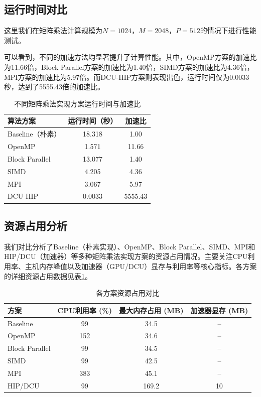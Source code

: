 \documentclass[UTF8,a4paper,10pt]{ctexart}
\begin{document}
\subsection{运行时间对比}

这里我们在矩阵乘法计算规模为$N=1024$，$M=2048$，$P=512$的情况下进行性能测试。

可以看到，不同的加速方法均显著提升了计算性能。其中，OpenMP方案的加速比为11.66倍，Block Parallel方案的加速比为1.40倍，SIMD方案的加速比为4.36倍，MPI方案的加速比为5.97倍。而DCU-HIP方案则表现出色，运行时间仅为0.0033秒，达到了5555.43倍的加速比。


\begin{table}[H]
\centering
\begin{tabular}{lcc}
\hline
\textbf{算法方案} & \textbf{运行时间（秒）} & \textbf{加速比} \\
\hline
Baseline（朴素）   & 18.318  & 1.00 \\
OpenMP            & 1.571   & 11.66 \\
Block Parallel    & 13.077  & 1.40 \\
SIMD              & 4.205   & 4.36 \\
MPI               & 3.067   & 5.97 \\
DCU-HIP               & 0.0033  & 5555.43 \\
\hline
\end{tabular}
\caption{不同矩阵乘法实现方案运行时间与加速比}
\end{table}


\subsection{资源占用分析}

我们对比分析了Baseline（朴素实现）、OpenMP、Block Parallel、SIMD、MPI和HIP/DCU（加速器）等多种矩阵乘法实现方案的资源占用情况。主要关注CPU利用率、主机内存峰值以及加速器（GPU/DCU）显存与利用率等核心指标。各方案的详细资源占用数据见表\ref{tab:resource}。


\begin{table}[H]
\centering
\begin{tabular}{lccc}
\hline
\textbf{方案} & \textbf{CPU利用率 (\%)} & \textbf{最大内存占用 (MB)} & \textbf{加速器显存 (MB)} \\
\hline
Baseline      & 99   & 34.5  & --     \\
OpenMP        & 152  & 34.6  & --     \\
Block Parallel& 99   & 34.5  & --     \\
SIMD          & 99   & 42.5  & --     \\
MPI           & 383  & 45.1  & --     \\
HIP/DCU       & 99   & 169.2 & 10     \\
\hline
\end{tabular}
\caption{各方案资源占用对比}
\label{tab:resource}
\end{table}
\end{document}
